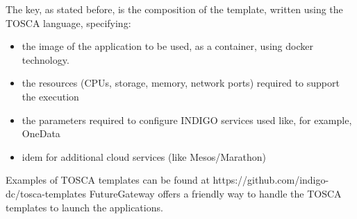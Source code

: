 \documentclass{article}
\begin{document}
The key, as stated before, is the composition of the template, written using the TOSCA language, specifying:

\begin{itemize}
\item the image of the application to be used, as a container, using docker technology.
\item the resources (CPUs, storage, memory, network ports) required to support the execution
\item the parameters required to configure INDIGO services used like, for example, OneData
\item idem for additional cloud services (like Mesos/Marathon)
\end{itemize}
Examples of TOSCA templates can be found at https://github.com/indigo-dc/tosca-templates FutureGateway offers a friendly way to handle the TOSCA templates to launch the applications.
\end{document}
